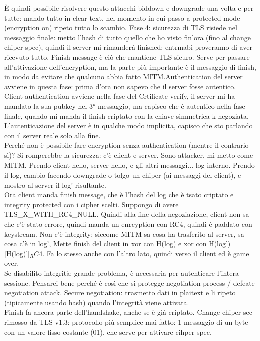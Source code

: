\documentclass[16px]{article}
\begin{document}
È quindi possibile risolvere questo attacchi biddown e downgrade una volta e per tutte: mando tutto in clear text, nel momento in cui passo a protected mode (encryption on) ripeto tutto lo scambio.
Fase 4: sicurezza di TLS risiede nel messaggio finale: metto l'hash di tutto quello che ho visto fin'ora (fino al change chiper spec), quindi il server mi rimanderà finished; entrmabi proveranno di aver ricevuto tutto. Finish message è ciò che mantiene TLS sicuro. Serve per passare all'attivazione dell'encryption, ma la parte più importante è il messaggio di finish, in modo da evitare che qualcuno abbia fatto MITM.Authentication del server avviene in questa fase: prima d'ora non sapevo che il server fosse autentico.\\ Client authentication avviene nella fase del Crtificate verify, il server mi ha mandato la sua pubkey nel 3° messaggio, ma capisco che è autentico nella fase finale, quando mi manda il finish criptato con la chiave simmetrica k negoziata.\\ L'autenticazione del server è in qualche modo implicita, capisco che sto parlando con il server reale solo alla fine.\\ Perché non è possibile fare encryption senza authentication (mentre il contrario sì)? Si romperebbe la sicurezza: c'è client e server. Sono attacker, mi metto come MITM. Prendo client hello, server hello, e gli altri messaggi... log interno. Prendo il log, cambio facendo downgrade o tolgo un chiper (ai messaggi del client), e mostro al server il log' risultante.\\ Ora client manda finish message, che è l'hash del log che è tsato criptato e integrity protected con i cipher scelti. Suppongo di avere TLS\_X\_WITH\_RC4\_NULL. Quindi alla fine della negoziazione, client non sa che c'è stato errore, quindi manda un enrcyption con RC4, quindi è paddato con keystream. Non c'è integrity: siccome MITM sa cosa ha trasferito al server, sa cosa c'è in log', Mette finish del client in xor con H(log) e xor con H(log') = [H(log)']$_RC4$. Fa lo stesso anche con l'altro lato, quindi verso il client ed è game over.\\ Se disabilito integrità: grande problema, è necessaria per autenticare l'intera sessione. Pensarci bene perché è così che si protegge negotiation process / defeate negotiation attack. Secure negotiation: trasmetto dati in plaitext e li ripeto (tipicamente usando hash) quando l'integrità viene attivata.\\ Finish fa ancora parte dell'handshake, anche se è già criptato. Change chiper sec rimosso da TLS v1.3: protocollo più semplice mai fatto: 1 messaggio di un byte con un valore fisso costante (01), che serve per attivare cihper spec.
\end{document}
